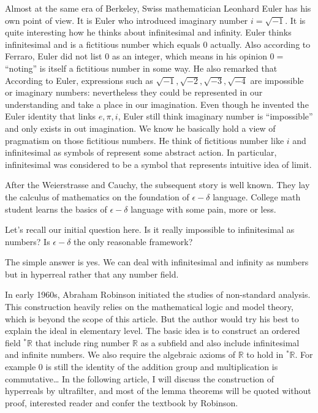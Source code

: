 \documentclass[11pt]{article}
\begin{document}
	Almost at the same era of Berkeley, Swiss mathematician Leonhard Euler has his own point of view. It is Euler who introduced imaginary number $i=\sqrt{-1}$. It is quite interesting how he thinks about infinitesimal and infinity. Euler thinks infinitesimal and is a fictitious number which equals $0$ actually. Also according to Ferraro, Euler did not list $0$ as an integer, which means in his opinion $0=$ “noting” is itself a fictitious number in some way. He also remarked that According to Euler, expressions such as $\sqrt{−1}, \sqrt{−2}, \sqrt{−3}, \sqrt{−4}$ are impossible or imaginary numbers: nevertheless they could be represented in our understanding and take a place in our imagination. Even though he invented the Euler identity that links $e, \pi, i$, Euler still think imaginary number is “impossible” and only exists in out imagination. We know he basically hold a view of pragmatism on those fictitious numbers. He think of fictitious number like $i$ and infinitesimal as symbols of represent some abstract action. In particular, infinitesimal was considered to be a symbol that represents intuitive idea of limit.

After the Weierstrasse and Cauchy, the subsequent story is well known. They lay the calculus of mathematics on the foundation of $\epsilon-\delta$ language. College math student learns the basics of $\epsilon-\delta$ language with some pain, more or less. 
	
	Let’s recall our initial question here. Is it really impossible to infinitesimal as numbers? Is $\epsilon-\delta$ the only reasonable framework?
	
	The simple answer is yes. We can deal with infinitesimal and infinity as numbers but in hyperreal rather that any number field.  
	
	In early 1960s, Abraham Robinson initiated the studies of non-standard analysis. This construction heavily relies on the mathematical logic and model theory, which is beyond the scope of this article. But the author would try his best to explain the ideal in elementary level. The basic idea is to construct an ordered field $^{*}\mathbb{R}$ that include ring number $\mathbb{R}$ as a subfield and also include infinitesimal and infinite numbers. We also require the algebraic axioms of $\mathbb{R}$ to hold in  $^{*}\mathbb{R}$. For example $0$ is still the identity of the addition group and multiplication is commutative… In the following article, I will discuss the construction of hyperreals by ultrafilter, and most of the lemma theorems will be quoted without proof, interested reader and confer the textbook by Robinson.
\end{document}
